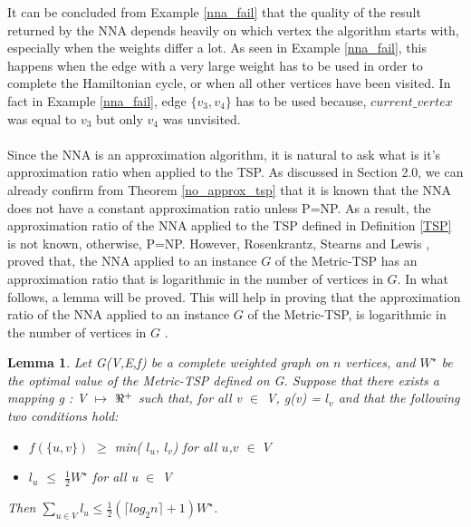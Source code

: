 \documentclass{article}
\newtheorem{lemma}[definition]{Lemma}
\begin{document}
It can be concluded from Example \ref{nna_fail} that the quality of the result returned by the NNA depends heavily on which vertex the algorithm starts with, especially when the weights differ a lot. As seen in Example \ref{nna_fail}, this happens when the edge with a very large weight has to be used in order to complete the Hamiltonian cycle, or when all other vertices have been visited. In fact in Example \ref{nna_fail}, edge $\{v_3, v_4\}$ has to be used because, $current\_vertex$ was equal to $v_3$ but only $v_4$ was unvisited.\\\\
Since the NNA is an approximation algorithm, it is natural to ask what is it's approximation ratio when applied to the TSP. As discussed in Section 2.0, we can already confirm from Theorem \ref{no_approx_tsp} that it is known that the NNA does not have a constant approximation ratio unless P=NP. As a result, the approximation ratio of the NNA applied to the TSP defined in Definition \ref{TSP} is not known, otherwise, P=NP. However, Rosenkrantz, Stearns and Lewis \cite{Rosenkrantz}, proved that, the NNA applied to an instance $G$ of the Metric-TSP has an approximation ratio that is logarithmic in the number of vertices in $G$. In what follows, a lemma will be proved. This will help in proving that the approximation ratio of the NNA applied to an instance $G$ of the Metric-TSP, is logarithmic in the number of vertices in $G$ . 
\begin{lemma}
\label{to_proove_bound}
Let G(V,E,f) be a complete weighted graph on $n$ vertices, and $W^\star$ be the optimal value of the Metric-TSP defined on G. Suppose that there exists a mapping g : V $\mapsto$ $\real^+$ such that, for all v $\in$ V, g(v) = $l_v$ and that the following  two conditions hold:
\begin{itemize}
\item $f(\{u, v\})$ $\geq$ min( $l_u$, $l_v$) for all $u$,$v$ $\in$ $V$
\item $l_u$ $\leq$ $\frac{1}{2}W^\star$ for all u $\in$ V
\end{itemize}
Then $\sum_{u \in V} l_u \leq \frac{1}{2}(\lceil log_2 n \rceil + 1)W^\star$. {}
\end{lemma}
\end{document}
